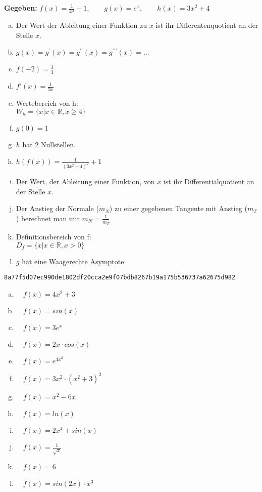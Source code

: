 \documentclass[a4paper,12pt]{article}
\newcommand{\Aufgabe}[2]{
	{
		\vspace*{0.3cm}
		\begin{tcolorbox}[breakable,colback=yellow!0,colframe=black!65!black,title=\textbf{Aufgabe #1:},width=\linewidth ]
			{#2}
		\end{tcolorbox}
		
		
	}
}
\newcommand{\SHA}[1]{
	\vspace*{0.1cm}
	\begin{tcolorbox}[breakable,colback=blue!5,colframe=blue!65!black,title=\textbf{Richtiger SHA256 Hash:},width=\linewidth ]
		{\texttt{{#1}}}
	\end{tcolorbox}
}
\begin{document}
	\Aufgabe{1\quad Kreuze die richtigen Antworten an}{
		\begin{center}
			\textbf{Gegeben:} \qquad $f(x)=\frac{1}{x^2} + 1,\qquad g(x)=e^x, \qquad h(x)=3x^2 + 4$\\
		\end{center}
		\begin{multicols}{2}
			\begin{enumerate}[(a){\qed}]
				\item Der Wert der Ableitung einer Funktion zu $x$ ist ihr Differentenquotient an der Stelle $x$.
				\item $g(x)=g^{\prime}(x)=g^{\prime\prime}(x)=g^{\prime\prime\prime}(x)=...$
				\item $f(-2)=\frac{3}{4}$
				\item $f'(x)=\frac{1}{2x}$
				\item Wertebereich von h:\\  $W_{h}=\{x | x \in \mathds{R}, x\geq 4\}$
				\item $g(0)=1$
				\item $h$ hat 2 Nullstellen.
				\item $h(f(x))= \frac{1}{(3x^2+4)^2} + 1$
				\item Der Wert, der Ableitung einer Funktion, von $x$ ist ihr Differentialquotient an der Stelle $x$.
				\item Der Anstieg der Normale ($m_N$) zu einer gegebenen Tangente mit Anstieg ($m_T$) berechnet man mit $m_N= \frac{1}{m_T}$
				\item Definitionsbereich von f:\\ $D_{f}=\{x| x\in \mathds{R}, x>0\}$
				\item $g$ hat eine Waagerechte Asymptote\\
			\end{enumerate}
		\end{multicols}
	\SHA{8a77f5d07ec990de1802df20cca2e9f07bdb8267b19a175b536737a62675d982}
	}
	\Aufgabe{2\quad Gib die Ableitungen der gegebenen Funktionen an}{
		\begin{multicols}{2}
			\begin{enumerate}[(a)]
				\item $\quad f(x)=4x^2 + 3$
				\item $\quad f(x)=sin(x)$
				\item $\quad f(x)=3e^x$
				\item $\quad f(x)=2x \cdot cos(x)$
				\item $\quad f(x)=e^{4x^2}$
				\item $\quad f(x)=3x^2 \cdot (x^2+3)^2$
				\item $\quad f(x)=x^2 - 6x$
				\item $\quad f(x)=ln(x)$
				\item $\quad f(x)=2x^4 + sin(x)$
				\item $\quad f(x)=\frac{1}{\sqrt{x}}$
				\item $\quad f(x)=6$
				\item $\quad f(x)= sin(2x)\cdot x^3$
			\end{enumerate}
		\end{multicols}
	}
\end{document}
